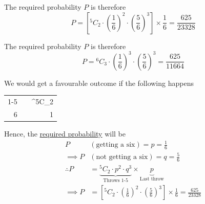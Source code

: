 \documentclass[14pt,fleqn]{extarticle}
\begin{document}
The required probability $P$ is therefore 
\[ P = \left[^5C_2\cdot\left(\frac{1}{6} \right)^2\cdot\left(\frac{5}{6}\right)^3\right]\times\frac{1}{6}=\frac{625}{23328} \]

\newcard

The required probability $P$ is therefore 
\[ P = {^6C_3}\cdot\left(\frac{1}{6} \right)^3\cdot\left(\frac{5}{6}\right)^3=\frac{625}{11664} \]

\newcard

We would get a favourable outcome if the following happens 

%
\begin{center}
\begin{tabular}{NNN}
\toprule
{} &  &  \\
-5 &  & ^5C_2 \\
 &  & 1 \\
\bottomrule 
\end{tabular}
\end{center} 

Hence, the \underline{required probability} will be 
%
\begin{align}
P &\left(\text{getting a six} \right) = p = \frac{1}{6}\\
\implies P &\left(\text{not getting a six} \right) = q = \frac{5}{6} \\
\therefore P &= \underbrace{^5C_2\cdot p^2\cdot q^3}_{\text{Throws 1-5}}\times\underbrace{p}_{\text{Last throw}} \\
\implies P &= \left[^5C_2\cdot\left(\frac{1}{6} \right)^2\cdot\left(\frac{5}{6}\right)^3\right]\times\frac{1}{6} = \frac{625}{23328}
\end{align}
\end{document}
